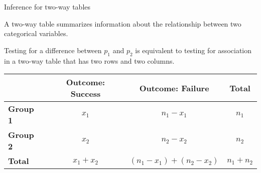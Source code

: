 \documentclass[
  ignorenonframetext,
  aspectratio=169]{beamer}
\begin{document}
\begin{frame}{Inference for two-way tables}
\protect\hypertarget{inference-for-two-way-tables-1}{}
\small

A two-way table summarizes information about the relationship between
two categorical variables.

Testing for a difference between \(p_1\) and \(p_2\) is equivalent to
testing for association in a two-way table that has two rows and two
columns.

\vspace{0.5cm}

\begin{center}
\begin{tabular}{l|cc|c} 
   & \textbf{Outcome: Success} & \textbf{Outcome: Failure} & \textbf{Total}\\ \hline
  \textbf{Group 1} & $x_1$ & $n_1 - x_1$ & $n_1$  \\
  \textbf{Group 2} & $x_2$ &  $n_2 - x_2$ & $n_2$ \\ \hline
  \textbf{Total} & $x_1 + x_2$ & $(n_1 - x_1) + (n_2 - x_2)$ & $n_1 + n_2$  \\ 
\end{tabular}\\
\end{center}
\end{frame}
\end{document}
